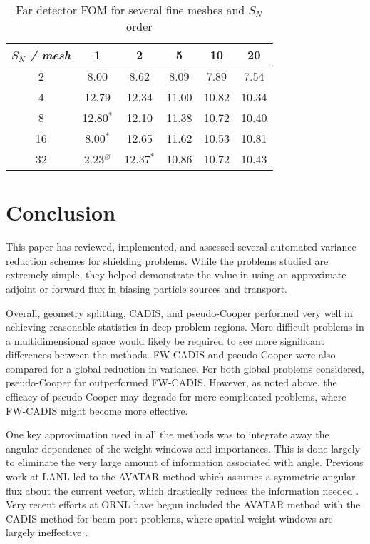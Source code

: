 \begin{table}[th]
 \caption{Far detector FOM for several fine meshes and $S_N$ order}
 \begin{center} 
 {\small
 \begin{tabular*}{0.45\textwidth}{@{\extracolsep{\fill}} cccccc } 
  \toprule 
   \emph{ $S_N$ / mesh}  &  1  &  2  &  5  &  10  &  20  \\
  \midrule 
   2  & 8.00 & 8.62 & 8.09 & 7.89 & 7.54 \\
   4  & 12.79 & 12.34 & 11.00 & 10.82 & 10.34 \\
   8  & 12.80$^{*}$ & 12.10 & 11.38 & 10.72 & 10.40 \\
   16 & 8.00$^{*}$ & 12.65 & 11.62 & 10.53 & 10.81 \\ 
   32 & 2.23$^{\varnothing}$ & 12.37$^{*}$ & 10.86 & 10.72 & 10.43 \\
  \bottomrule 
 \end{tabular*} 
 }
 \end{center} 
 \label{tbl:snmeshstudy}  
\end{table}



\section{Conclusion}
\label{sec:conc}

This paper has reviewed, implemented, and assessed several automated variance
reduction schemes for shielding problems.  While the problems studied are
extremely simple, they helped demonstrate the value in using an approximate
adjoint or forward flux in biasing particle sources and transport.  

Overall, geometry splitting, CADIS, and pseudo-Cooper performed very well in
achieving reasonable statistics in deep problem regions.  More difficult
problems in a multidimensional space would likely be required to see more
significant differences between the methods.   FW-CADIS and pseudo-Cooper were
also compared for a global reduction in variance.  For both global problems
considered, pseudo-Cooper far outperformed FW-CADIS.   However, as noted above,
the efficacy of pseudo-Cooper may degrade for more complicated problems, where
FW-CADIS might become more effective.

One key approximation used in all the methods was to integrate away the angular
dependence of the weight windows and importances.  This is done largely to
eliminate the very large amount of information associated with angle.  Previous
work at LANL led to the AVATAR method which assumes a symmetric angular flux
about the current vector, which drastically reduces the information needed
\cite{vanriper1997ava}.  Very recent efforts at ORNL have begun included the
AVATAR method with the CADIS method for beam port problems, where spatial weight
windows are largely ineffective \cite{peplow2010hmc}.  

